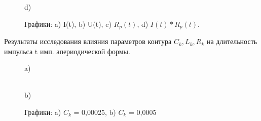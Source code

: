 \begin{figure}[H]
\begin{minipage}[h]{0.47\linewidth}
\end{minipage}
\hfill
\begin{minipage}[h]{0.47\linewidth}
 d) \\
\end{minipage}
\caption{Графики: a) I(t), b)
U(t), c) $R_p(t)$, d) $I(t)*R_p(t)$.}
\label{fig:fig7}
\end{figure}

Результаты исследования влияния параметров контура $C_k, L_k, R_k$ на длительность импульса t имп. апериодической формы.

\begin{figure}[H]
\begin{minipage}[h]{0.47\linewidth}
 a) \\
\end{minipage}
\hfill
\begin{minipage}[h]{0.47\linewidth}
 \\b)
\end{minipage}
\caption{Графики: a) $C_k$ = 0,00025, b)
$C_k$ = 0,0005}
\label{fig:fig8}
\end{figure}

